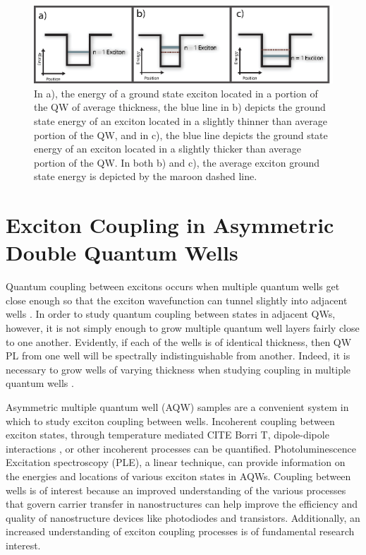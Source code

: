 \newpage
\begin{figure}[t!]
\label{rel-thickness}
\centering
\includegraphics[width = .9\textwidth]{rel-thickness.eps}
\caption{\doublespacing In a), the energy of a ground state exciton located in a portion of the QW of average thickness, the blue line in b) depicts the ground state energy of an exciton located in a slightly thinner than average portion of the QW,  and in c), the blue line depicts the ground state energy of an exciton located in a slightly thicker than average portion of the QW. In both b) and c), the average exciton ground state energy is depicted by the maroon dashed line.}
\end{figure}

\section{Exciton Coupling in Asymmetric Double Quantum Wells}

\indent Quantum coupling between excitons occurs when multiple quantum wells get close enough so that the exciton wavefunction can tunnel slightly into adjacent wells \cite{griffiths, davies}. In order to study quantum coupling between states in adjacent QWs, however, it is not simply enough to grow multiple quantum well layers fairly close to one another. Evidently, if each of the wells is of identical thickness, then QW PL  from one well will be spectrally indistinguishable from another. Indeed, it is necessary to grow wells of varying thickness when studying coupling in multiple quantum wells \cite{hegartycouple}. 

\indent Asymmetric multiple quantum well (AQW) samples are a convenient system in which to study exciton coupling between wells. Incoherent coupling between exciton states, through temperature mediated CITE Borri T, dipole-dipole interactions  \cite{tomita}, or other incoherent processes can be quantified. Photoluminescence Excitation spectroscopy (PLE), a linear technique, can provide information on the energies and locations of various exciton states in AQWs. Coupling between wells is of interest because an improved understanding of the various processes that govern carrier transfer in nanostructures can help improve the efficiency and quality of nanostructure devices like photodiodes and transistors. Additionally, an increased understanding of exciton coupling processes is of fundamental research interest.



